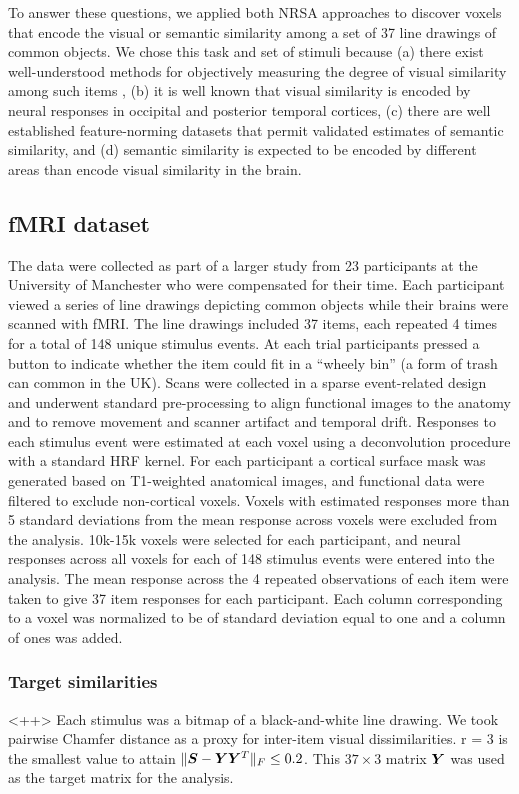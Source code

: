 To answer these questions, we applied both NRSA approaches to discover voxels that
encode the visual or semantic similarity among a set of 37 line drawings of common objects.
We chose this task and set of stimuli because (a) there exist well-understood methods for
objectively measuring the degree of visual similarity among such items \cite{antani02},
(b) it is well known that visual similarity is encoded by neural responses in occipital
and posterior temporal cortices, (c) there are well established feature-norming datasets
that permit validated estimates of semantic similarity, and (d) semantic similarity is
expected to be encoded by different areas than encode visual similarity in the brain.

\subsection{fMRI dataset} The data were collected as part of a larger study from 23
participants at the University of Manchester who were compensated for their time. Each
participant viewed a series of line drawings depicting common objects while their brains
were scanned with fMRI. The line drawings included 37 items, each repeated 4 times for a
total of 148 unique stimulus events. At each trial participants pressed a button to
indicate whether the item could fit in a ``wheely bin'' (a form of trash can common in the
UK). Scans were collected in a sparse event-related design and underwent standard
pre-processing to align functional images to the anatomy and to remove movement and scanner
artifact and temporal drift. Responses to each stimulus event were estimated at each voxel
using a deconvolution procedure with a standard HRF kernel. For each participant a cortical
surface mask was generated based on T1-weighted anatomical images, and functional data were
filtered to exclude non-cortical voxels. Voxels with estimated responses more than 5
standard deviations from the mean response across voxels were excluded from the analysis.
10k-15k voxels were selected for each participant, and neural responses across all voxels
for each of 148 stimulus events were entered into the analysis. The mean response across
the 4 repeated observations of each item were taken to give 37 item responses for each
participant. Each column corresponding to a voxel was normalized to be of standard
deviation equal to one and a column of ones was added.

\subsubsection*{Target similarities}
<++>
 Each stimulus was a bitmap of a black-and-white line drawing. We took pairwise Chamfer distance as a proxy for inter-item visual dissimilarities. r = 3 is the smallest value to attain $\|\boldsymbol{S} - \boldsymbol{Y}\boldsymbol{Y}^T\|_F \leq 0.2$. This $37 \times 3$ matrix $\boldsymbol{Y}$ was used as the target matrix for the analysis.

